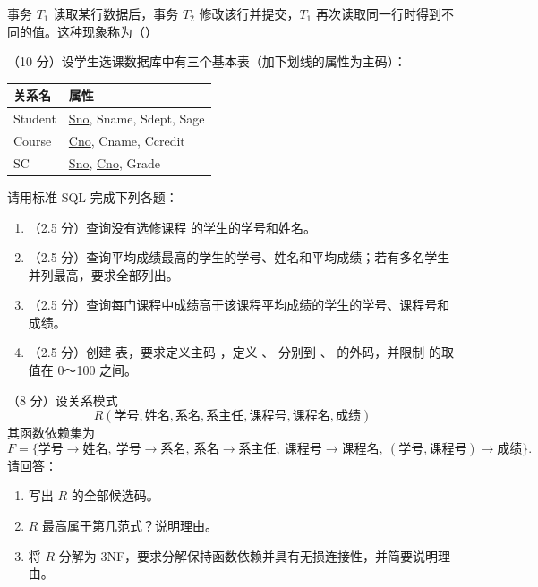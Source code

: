 \documentclass[a4paper,11pt]{article}
\begin{document}
\q 事务 $T_1$ 读取某行数据后，事务 $T_2$ 修改该行并提交，$T_1$ 再次读取同一行时得到不同的值。这种现象称为（\quad）


\q （10 分）设学生选课数据库中有三个基本表（加下划线的属性为主码）：
\begin{center}\small
\begin{tabular}{ll}
\toprule
关系名 & 属性 \\
\midrule
Student & \underline{Sno}, Sname, Sdept, Sage \\
Course & \underline{Cno}, Cname, Ccredit \\
SC & \underline{Sno}, \underline{Cno}, Grade \\
\bottomrule
\end{tabular}
\end{center}
请用标准 SQL 完成下列各题：
\begin{enumerate}[label=（\arabic*）, leftmargin=2.4em, itemsep=1pt]
  \item （2.5 分）查询没有选修课程  的学生的学号和姓名。
  \item （2.5 分）查询平均成绩最高的学生的学号、姓名和平均成绩；若有多名学生并列最高，要求全部列出。
  \item （2.5 分）查询每门课程中成绩高于该课程平均成绩的学生的学号、课程号和成绩。
  \item （2.5 分）创建  表，要求定义主码 ，定义 、 分别到 、 的外码，并限制  的取值在 0～100 之间。
\end{enumerate}
\anslines{9cm}

\q （8 分）设关系模式
\[
R(\text{学号},\text{姓名},\text{系名},\text{系主任},\text{课程号},\text{课程名},\text{成绩})
\]
其函数依赖集为
\[
F=\{\text{学号}\to\text{姓名},\ \text{学号}\to\text{系名},\ \text{系名}\to\text{系主任},\ \text{课程号}\to\text{课程名},\ (\text{学号},\text{课程号})\to\text{成绩}\}.
\]
请回答：
\begin{enumerate}[label=（\arabic*）, leftmargin=2.4em, itemsep=1pt]
  \item 写出 $R$ 的全部候选码。
  \item $R$ 最高属于第几范式？说明理由。
  \item 将 $R$ 分解为 3NF，要求分解保持函数依赖并具有无损连接性，并简要说明理由。
\end{enumerate}
\anslines{7cm}
\end{document}
